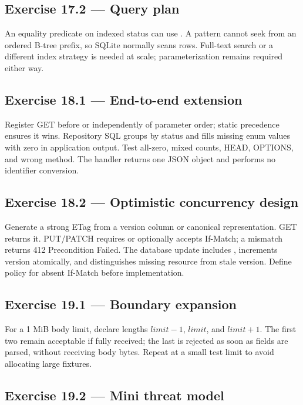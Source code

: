 \subsection*{Exercise 17.2 --- Query plan}

An equality predicate on indexed status can use . A
pattern  cannot seek from an ordered B-tree prefix, so SQLite
normally scans rows. Full-text search or a different index strategy is needed at
scale; parameterization remains required either way.

\subsection*{Exercise 18.1 --- End-to-end extension}

Register GET  before or independently of parameter order;
static precedence ensures it wins. Repository SQL groups by status and fills
missing enum values with zero in application output. Test all-zero, mixed counts,
HEAD, OPTIONS, and wrong method. The handler returns one JSON object and performs
no identifier conversion.

\subsection*{Exercise 18.2 --- Optimistic concurrency design}

Generate a strong ETag from a version column or canonical representation. GET
returns it. PUT/PATCH requires or optionally accepts If-Match; a mismatch returns
412 Precondition Failed. The database update includes , increments version atomically, and distinguishes missing resource
from stale version. Define policy for absent If-Match before implementation.

\subsection*{Exercise 19.1 --- Boundary expansion}

For a 1 MiB body limit, declare lengths $limit-1$, $limit$, and $limit+1$. The
first two remain acceptable if fully received; the last is rejected as soon as
fields are parsed, without receiving body bytes. Repeat at a small test limit to
avoid allocating large fixtures.

\subsection*{Exercise 19.2 --- Mini threat model}

